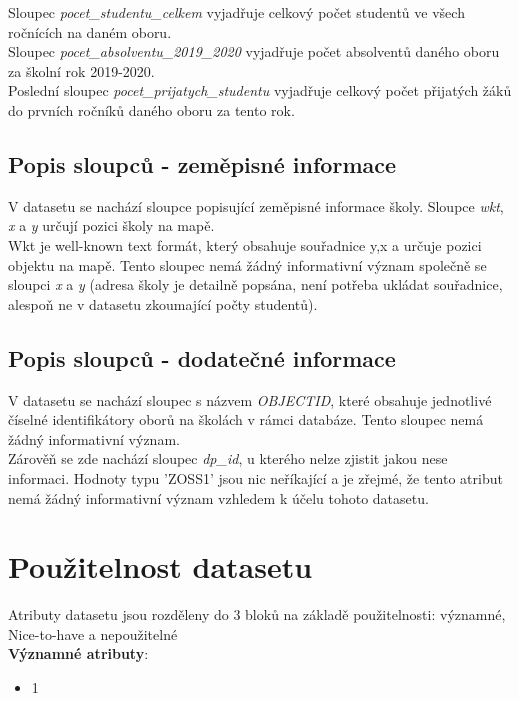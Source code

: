 \documentclass[12pt, a4paper]{article}
\begin{document}
Sloupec \textit{pocet\_studentu\_celkem} vyjadřuje celkový počet studentů ve všech ročnících na daném oboru. \\

Sloupec \textit{pocet\_absolventu\_2019\_2020} vyjadřuje počet absolventů daného oboru za školní rok 2019-2020. \\

Poslední sloupec \textit{pocet\_prijatych\_studentu} vyjadřuje celkový počet přijatých žáků do prvních ročníků daného oboru za tento rok. \\


\subsection{Popis sloupců - zeměpisné informace}
V datasetu se nachází sloupce popisující zeměpisné informace školy. Sloupce \textit{wkt}, \textit{x} a \textit{y} určují pozici školy na mapě.\\
Wkt je well-known text formát, který obsahuje souřadnice y,x a určuje pozici objektu na mapě. Tento sloupec nemá žádný informativní význam společně se sloupci \textit{x} a \textit{y} (adresa školy je detailně popsána, není potřeba ukládat souřadnice, alespoň ne v datasetu zkoumající počty studentů).


\subsection{Popis sloupců - dodatečné informace}
V datasetu se nachází sloupec s názvem \textit{OBJECTID}, které obsahuje jednotlivé číselné identifikátory oborů na školách v rámci databáze. Tento sloupec nemá žádný informativní význam.\\
Zárověň se zde nachází sloupec \textit{dp\_id}, u kterého nelze zjistit jakou nese informaci. Hodnoty typu 'ZOSS1' jsou nic neříkající a je zřejmé, že tento atribut nemá žádný informativní význam vzhledem k účelu tohoto datasetu. 



\newpage

\section{Použitelnost datasetu}
\noindent Atributy datasetu jsou rozděleny do 3 bloků na základě použitelnosti: významné, Nice-to-have a nepoužitelné\\
\noindent \textbf{Významné atributy}:
\begin{itemize}
\item 1 \\
\end{itemize}
\end{document}
